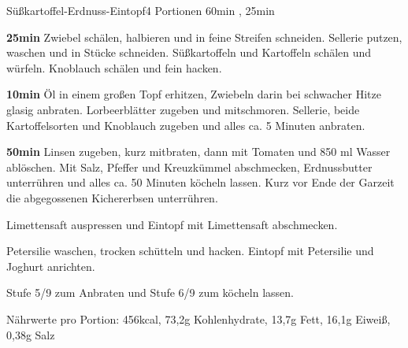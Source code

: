 \documentclass[../recipe-collections/cooking.tex]{subfiles}
\begin{document}
\begin{recipe}{Süßkartoffel-Erdnuss-Eintopf}{4 Portionen }{60min , 25min }

  \freeform{}\textit{}


  \textbf{25min}
  Zwiebel schälen, halbieren und in feine Streifen schneiden.
  Sellerie putzen, waschen und in Stücke schneiden.
  Süßkartoffeln und Kartoffeln schälen und würfeln.
  Knoblauch schälen und fein hacken.


  \textbf{10min}
  Öl in einem großen Topf erhitzen, Zwiebeln darin bei schwacher Hitze glasig anbraten.
  Lorbeerblätter zugeben und mitschmoren.
  Sellerie, beide Kartoffelsorten und Knoblauch zugeben und alles ca. 5 Minuten anbraten.


  \textbf{50min}
  Linsen zugeben, kurz mitbraten, dann mit Tomaten und 850 ml Wasser ablöschen.
  Mit Salz, Pfeffer und Kreuzkümmel abschmecken, Erdnussbutter unterrühren und alles ca. 50 Minuten köcheln lassen.
  Kurz vor Ende der Garzeit die abgegossenen Kichererbsen unterrühren.


  Limettensaft auspressen und Eintopf mit Limettensaft abschmecken.


  Petersilie waschen, trocken schütteln und hacken.
  Eintopf mit Petersilie und Joghurt anrichten.

  \freeform{}\hrulefill{}

  \freeform{}
  Stufe 5/9 zum Anbraten und Stufe 6/9 zum köcheln lassen.

  \freeform{}
  Nährwerte pro Portion: 456kcal, 73,2g Kohlenhydrate, 13,7g Fett, 16,1g Eiweiß, 0,38g Salz

\end{recipe}
\end{document}
